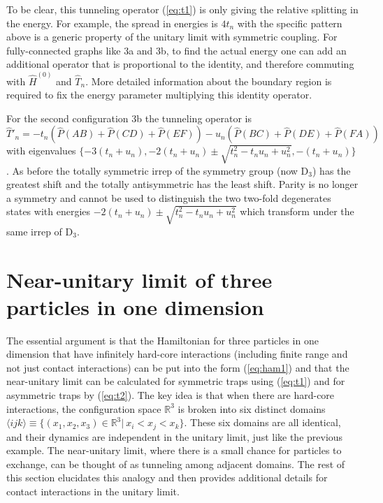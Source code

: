 To be clear, this tunneling operator (\ref{eq:t1}) is only giving the relative splitting in the energy. For example, the spread in energies is $4 t_n$ with the specific pattern above is a generic property of the unitary limit with symmetric coupling. For fully-connected graphs like 3a and 3b, to find the actual energy one can add an additional operator that is proportional to the identity, and therefore commuting with $\hat{H}^{(0)}$ and $\hat{T}_n$. More detailed information about the boundary region is required to fix the energy parameter multiplying this identity operator.


For the second configuration 3b the tunneling operator is
\begin{equation}\label{eq:t2}
\hat{T}'_n = -t_n \left( \hat{P}(AB)  + \hat{P}(CD)  + \hat{P}(EF)\right) - u_n \left(\hat{P}(BC) + \hat{P}(DE) + \hat{P}(FA) \right)
\end{equation}
with eigenvalues $\{-3(t_n+u_n), -2(t_n + u_n) \pm \sqrt{t_n^2 -t_nu_n + u_n^2}, -(t_n +u_n)\}$. 
As before the totally symmetric irrep of the symmetry group (now $\mathrm{D}_3$) has the greatest shift and the totally antisymmetric has the least shift. Parity is no longer a symmetry and cannot be used to distinguish the two two-fold degenerates states with energies $-2(t_n + u_n) \pm \sqrt{t_n^2 -t_nu_n + u_n^2}$ which transform under the same irrep of $\mathrm{D}_3$.


\section{Near-unitary limit of three particles in one dimension}

The essential argument is that the Hamiltonian for three particles in one dimension that have infinitely hard-core interactions (including finite range and not just contact interactions) can be put into the form (\ref{eq:ham1}) and that the near-unitary limit can be calculated for symmetric traps using (\ref{eq:t1}) and for asymmetric traps by (\ref{eq:t2}). The key idea is that when there are hard-core interactions, the configuration space $\mathbb{R}^3$ is broken into six distinct domains $\langle ijk \rangle \equiv \{ (x_1, x_2, x_3) \in \mathbb{R}^3 | \ x_i < x_j < x_k \} $. These six domains are all identical, and their dynamics are independent in the unitary limit, just like the previous example. The near-unitary limit, where there is a small chance for particles to exchange, can be thought of as tunneling among adjacent domains. The rest of this section elucidates this analogy and then provides additional details for contact interactions in the unitary limit.

